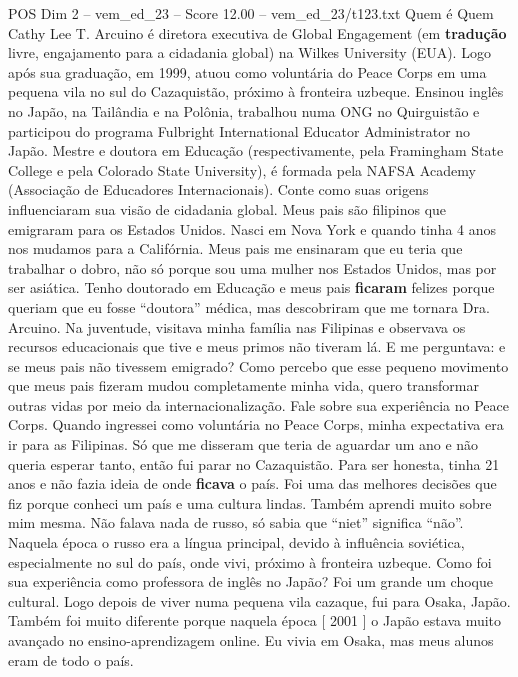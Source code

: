 \begin{textsample}{POS Dim 2 – vem\_ed\_23 – Score 12.00 – vem\_ed\_23/t123.txt}  \label{ex:f2_pos_109}
Quem é Quem Cathy Lee T.
Arcuino é diretora executiva de Global Engagement (em \textbf{tradução} livre, engajamento para a cidadania global) na Wilkes University (EUA).
Logo após sua graduação, em 1999, atuou como voluntária do Peace Corps em uma pequena vila no sul do Cazaquistão, próximo à fronteira uzbeque.
Ensinou inglês no Japão, na Tailândia e na Polônia, trabalhou numa ONG no Quirguistão e participou do programa Fulbright International Educator Administrator no Japão.
Mestre e doutora em Educação (respectivamente, pela Framingham State College e pela Colorado State University), é formada pela NAFSA Academy (Associação de Educadores Internacionais).
Conte como suas origens influenciaram sua visão de cidadania global.
Meus pais são filipinos que emigraram para os Estados Unidos.
Nasci em Nova York e quando tinha 4 anos nos mudamos para a Califórnia.
Meus pais me ensinaram que eu teria que trabalhar o dobro, não só porque sou uma mulher nos Estados Unidos, mas por ser asiática.
Tenho doutorado em Educação e meus pais \textbf{ficaram} felizes porque queriam que eu fosse “doutora” médica, mas descobriram que me tornara Dra.
Arcuino.
Na juventude, visitava minha família nas Filipinas e observava os recursos educacionais que tive e meus primos não tiveram lá.
E me perguntava: e se meus pais não tivessem emigrado?
Como percebo que esse pequeno movimento que meus pais fizeram mudou completamente minha vida, quero transformar outras vidas por meio da internacionalização.
Fale sobre sua experiência no Peace Corps.
Quando ingressei como voluntária no Peace Corps, minha expectativa era ir para as Filipinas.
Só que me disseram que teria de aguardar um ano e não queria esperar tanto, então fui parar no Cazaquistão.
Para ser honesta, tinha 21 anos e não fazia ideia de onde \textbf{ficava} o país.
Foi uma das melhores decisões que fiz porque conheci um país e uma cultura lindas.
Também aprendi muito sobre mim mesma.
Não falava nada de russo, só sabia que “niet” significa “não”.
Naquela época o russo era a língua principal, devido à influência soviética, especialmente no sul do país, onde vivi, próximo à fronteira uzbeque.
Como foi sua experiência como professora de inglês no Japão?
Foi um grande um choque cultural.
Logo depois de viver numa pequena vila cazaque, fui para Osaka, Japão.
Também foi muito diferente porque naquela época [ 2001 ] o Japão estava muito avançado no ensino-aprendizagem online.
Eu vivia em Osaka, mas meus alunos eram de todo o país.

\end{textsample}
